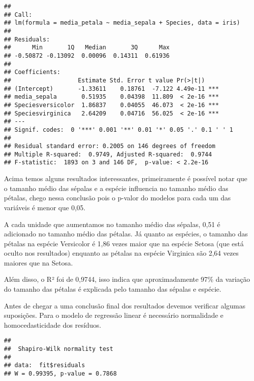 \documentclass[
]{book}
\newenvironment{Shaded}{\begin{snugshade}}{\end{snugshade}}
\newcommand{\CommentTok}[1]{\textcolor[rgb]{0.56,0.35,0.01}{\textit{#1}}}
\newcommand{\FunctionTok}[1]{\textcolor[rgb]{0.00,0.00,0.00}{#1}}
\newcommand{\NormalTok}[1]{#1}
\newcommand{\SpecialCharTok}[1]{\textcolor[rgb]{0.00,0.00,0.00}{#1}}
\begin{document}
\begin{verbatim}
## 
## Call:
## lm(formula = media_petala ~ media_sepala + Species, data = iris)
## 
## Residuals:
##      Min       1Q   Median       3Q      Max 
## -0.50872 -0.13092  0.00096  0.14311  0.61936 
## 
## Coefficients:
##                   Estimate Std. Error t value Pr(>|t|)    
## (Intercept)       -1.33611    0.18761  -7.122 4.49e-11 ***
## media_sepala       0.51935    0.04398  11.809  < 2e-16 ***
## Speciesversicolor  1.86837    0.04055  46.073  < 2e-16 ***
## Speciesvirginica   2.64209    0.04716  56.025  < 2e-16 ***
## ---
## Signif. codes:  0 '***' 0.001 '**' 0.01 '*' 0.05 '.' 0.1 ' ' 1
## 
## Residual standard error: 0.2005 on 146 degrees of freedom
## Multiple R-squared:  0.9749, Adjusted R-squared:  0.9744 
## F-statistic:  1893 on 3 and 146 DF,  p-value: < 2.2e-16
\end{verbatim}

Acima temos alguns resultados interessantes, primeiramente é possível notar que o tamanho médio das sépalas e a espécie influencia no tamanho médio das pétalas, chego nessa conclusão pois o p-valor do modelos para cada um das variáveis é menor que 0,05.

A cada unidade que aumentamos no tamanho médio das sépalas, 0,51 é adicionado no tamanho médio das pétalas. Já quanto as espécies, o tamanho das pétalas na espécie Versicolor é 1,86 vezes maior que na espécie Setosa (que está oculto nos resultados) enquanto as pétalas na espécie Virginica são 2,64 vezes maiores que na Setosa.

Além disso, o R² foi de 0,9744, isso indica que aproximadamente 97\% da variação do tamanho das pétalas é explicada pelo tamanho das sépalas e espécie.

Antes de chegar a uma conclusão final dos resultados devemos verificar algumas suposições. Para o modelo de regressão linear é necessário normalidade e homocedasticidade dos resíduos.

\begin{Shaded}
\end{Shaded}

\begin{verbatim}
## 
##  Shapiro-Wilk normality test
## 
## data:  fit$residuals
## W = 0.99395, p-value = 0.7868
\end{verbatim}
\end{document}
